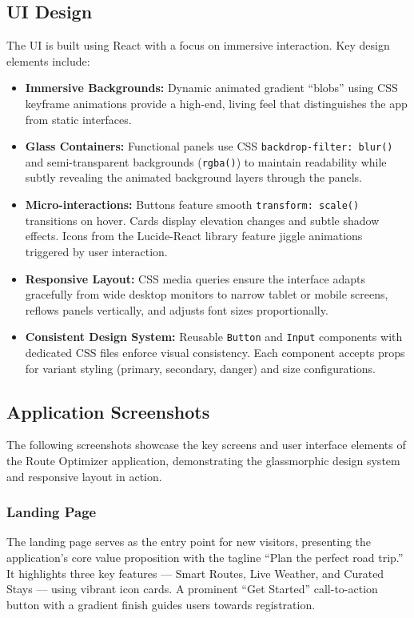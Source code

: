 \subsection{UI Design}
The UI is built using React with a focus on immersive interaction. Key design elements include:
\begin{itemize}
    \item \textbf{Immersive Backgrounds:} Dynamic animated gradient ``blobs'' using CSS keyframe animations provide a high-end, living feel that distinguishes the app from static interfaces.
    \item \textbf{Glass Containers:} Functional panels use CSS \texttt{backdrop-filter: blur()} and semi-transparent backgrounds (\texttt{rgba()}) to maintain readability while subtly revealing the animated background layers through the panels.
    \item \textbf{Micro-interactions:} Buttons feature smooth \texttt{transform: scale()} transitions on hover. Cards display elevation changes and subtle shadow effects. Icons from the Lucide-React library feature jiggle animations triggered by user interaction.
    \item \textbf{Responsive Layout:} CSS media queries ensure the interface adapts gracefully from wide desktop monitors to narrow tablet or mobile screens, reflows panels vertically, and adjusts font sizes proportionally.
    \item \textbf{Consistent Design System:} Reusable \texttt{Button} and \texttt{Input} components with dedicated CSS files enforce visual consistency. Each component accepts props for variant styling (primary, secondary, danger) and size configurations.
\end{itemize}

\subsection{Application Screenshots}
The following screenshots showcase the key screens and user interface elements of the Route Optimizer application, demonstrating the glassmorphic design system and responsive layout in action.

\subsubsection{Landing Page}
The landing page serves as the entry point for new visitors, presenting the application's core value proposition with the tagline ``Plan the perfect road trip.'' It highlights three key features --- Smart Routes, Live Weather, and Curated Stays --- using vibrant icon cards. A prominent ``Get Started'' call-to-action button with a gradient finish guides users towards registration.

